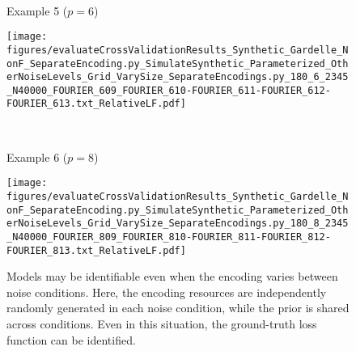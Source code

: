 \documentclass[si.tex]{subfiles}
\begin{document}
\begin{figure}
\begin{minipage}[b]{0.45\linewidth}
\ 

Example 5 ($p=6$)

\texttt{[image: figures/evaluateCrossValidationResults\_Synthetic\_Gardelle\_NonF\_SeparateEncoding.py\_SimulateSynthetic\_Parameterized\_OtherNoiseLevels\_Grid\_VarySize\_SeparateEncodings.py\_180\_6\_2345\_N40000\_FOURIER\_609\_FOURIER\_610-FOURIER\_611-FOURIER\_612-FOURIER\_613.txt\_RelativeLF.pdf]}

\ 

Example 6 ($p=8$)






\texttt{[image: figures/evaluateCrossValidationResults\_Synthetic\_Gardelle\_NonF\_SeparateEncoding.py\_SimulateSynthetic\_Parameterized\_OtherNoiseLevels\_Grid\_VarySize\_SeparateEncodings.py\_180\_8\_2345\_N40000\_FOURIER\_809\_FOURIER\_810-FOURIER\_811-FOURIER\_812-FOURIER\_813.txt\_RelativeLF.pdf]}

\end{minipage}



\caption{Models may be identifiable even when the encoding varies between noise conditions. Here, the encoding resources are independently randomly generated in each noise condition, while the prior is shared across conditions. Even in this situation, the ground-truth loss function can be identified.}\label{fig:encoding-varies-fourier}
\end{figure}
\end{document}
